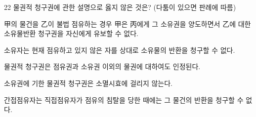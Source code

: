 \begin{question}{22}
물권적 청구권에 관한 설명으로 옳지 않은 것은? (다툼이 있으면 판례에 따름)
\begin{choices}
  \item 甲의 물건을 乙이 불법 점유하는 경우 甲은 丙에게 그 소유권을 양도하면서 乙에 대한 소유물반환 청구권을 자신에게 유보할 수 없다.
  \item 소유자는 현재 점유하고 있지 않은 자를 상대로 소유물의 반환을 청구할 수 없다.
  \item 물권적 청구권은 점유권과 소유권 이외의 물권에 대하여도 인정된다.
  \item 소유권에 기한 물권적 청구권은 소멸시효에 걸리지 않는다.
  \item 간접점유자는 직접점유자가 점유의 침탈을 당한 때에는 그 물건의 반환을 청구할 수 없다.
\end{choices}
\end{question}
